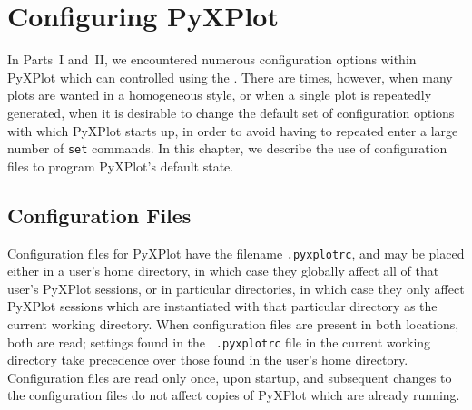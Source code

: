 %
%
%
%
%



\chapter{Configuring PyXPlot}
\label{ch:configuration}

\renewcommand{\arraystretch}{1.80}

In Parts~I and~II, we encountered numerous configuration options within PyXPlot
which can controlled using the . There are times, however, when
many plots are wanted in a homogeneous style, or when a single plot is
repeatedly generated, when it is desirable to change the default set of
configuration options with which PyXPlot starts up, in order to avoid having to
repeated enter a large number of {\tt set} commands. In this chapter, we
describe the use of configuration files to program PyXPlot's default state.

\section{Configuration Files}

Configuration files for PyXPlot have the filename {\tt .pyxplotrc}, and may be
placed either in a user's home directory, in which case they globally affect
all of that user's PyXPlot sessions, or in particular directories, in which
case they only affect PyXPlot sessions which are instantiated with that
particular directory as the current working directory.  When configuration
files are present in both locations, both are read; settings found in the {\tt
.pyxplotrc} file in the current working directory take precedence over those
found in the user's home directory. Configuration files are read only once,
upon startup, and subsequent changes to the configuration files do not affect
copies of PyXPlot which are already running.

